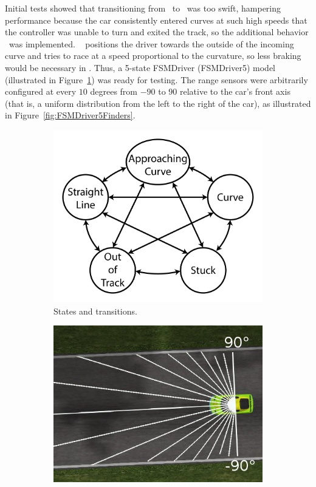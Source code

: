 Initial tests showed that transitioning from \SL~to \C~was too swift, hampering performance because the car consistently entered curves at such high speeds that the controller was unable to turn and exited the track, so the additional behavior \AC~was implemented. \AC~ positions the driver towards the outside of the incoming curve and tries to race at a speed proportional to the curvature, so less braking would be necessary in \C. Thus, a 5-state FSMDriver (FSMDriver5) model (illustrated in Figure~\ref{fig:FSMDriver5Model}) was ready for testing. The range sensors were arbitrarily configured at every $10$ degrees from $-90$ to $90$ relative to the car's front axis (that is, a uniform distribution from the left to the right of the car), as illustrated in Figure~\ref{fig:FSMDriver5Finders}.

\begin{figure}
\centering
\begin{subfigure}[b]{0.4\textwidth}
   \includegraphics[width=\textwidth]{img/FiveStateFSM}
   \caption{States and transitions.}\label{fig:FSMDriver5Model}%
\end{subfigure}
\begin{subfigure}[b]{0.4\textwidth}
   \includegraphics[width=\textwidth]{img/FSM5Sensors}

\end{subfigure}
\end{figure}
